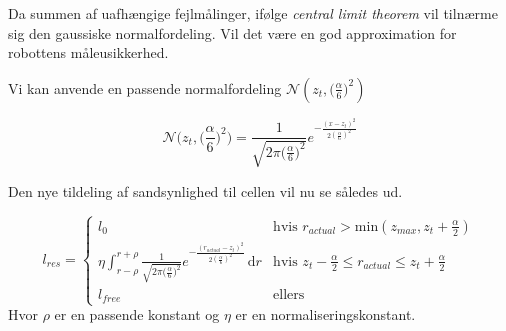 Da summen af uafhængige fejlmålinger, ifølge \emph{central limit theorem} vil tilnærme sig
den gaussiske normalfordeling. \cite[p. 223]{ArtificialIntelligence}
Vil det være en god approximation for robottens måleusikkerhed.


Vi kan anvende en passende normalfordeling $\mathcal{N}(z_t,\big(\frac{\alpha}{6}\big)^2)$ 




$$\mathcal{N}\bigg(z_t,\bigg(\frac{\alpha}{6}\bigg)^2\bigg) = 
\frac{1}{\sqrt{2 \pi \big(\frac{\alpha}{6}\big)^2}}e^{- \frac{(x - z_t)^2}{2 (\frac{\alpha}{6})^2}}$$

Den nye tildeling af sandsynlighed til cellen vil nu se således ud.

$$l_{res} = \begin{cases} 
	l_0 &\text{hvis }r_{actual} > \text{min}(z_{max},z_t+\frac{\alpha}{2}) \\ 
	
	
	\eta \int_{r-\rho}^{r+\rho} \frac{1}{\sqrt{2 \pi \big(\frac{\alpha}{6}\big)^2}}e^{- \frac{(r_{actual} - z_t)^2}{2 (\frac{\alpha}{6})^2}}\, \mathrm{d}r
		&\text{hvis } z_t-\frac{\alpha}{2} \leq r_{actual} \leq z_t+\frac{\alpha}{2}\\ 

	l_{free} &\text{ellers}	
\end{cases}$$
Hvor $\rho$ er en passende konstant og $\eta$ er en normaliseringskonstant.







